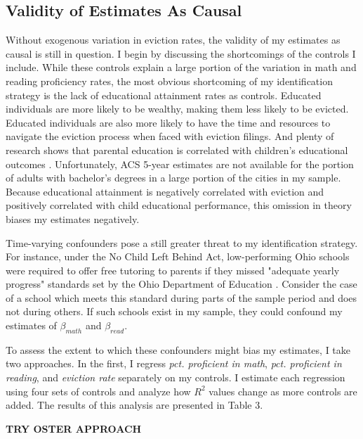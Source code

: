 \documentclass[12pt]{article}
\begin{document}
\subsection{Validity of Estimates As Causal}
Without exogenous variation in eviction rates, the validity of my estimates as causal is still in question. I begin by discussing the shortcomings of the controls I include. While these controls explain a large portion of the variation in math and reading proficiency rates, the most obvious shortcoming of my identification strategy is the lack of educational attainment rates as controls. Educated individuals are more likely to be wealthy, making them less likely to be evicted. Educated individuals are also more likely to have the time and resources to navigate the eviction process when faced with eviction filings. And plenty of research shows that parental education is correlated with children's educational outcomes \citep{havemen}. Unfortunately, ACS 5-year estimates are not available for the portion of adults with bachelor's degrees in a large portion of the cities in my sample. Because educational attainment is negatively correlated with eviction and positively correlated with child educational performance, this omission in theory biases my estimates negatively. 


Time-varying confounders pose a still greater threat to my identification strategy. For instance, under the No Child Left Behind Act, low-performing Ohio schools were required to offer free tutoring to parents if they missed "adequate yearly progress" standards set by the Ohio Department of Education \citep{klein_no_2015}. Consider the case of a school which meets this standard during parts of the sample period and does not during others. If such schools exist in my sample, they could confound my estimates of $\beta_{math}$ and $\beta_{read}$.


To assess the extent to which these confounders might bias my estimates, I take two approaches. In the first, I regress \emph{pct. proficient in math}, \emph{pct. proficient in reading}, and \emph{eviction rate} separately on my controls. I estimate each regression using four sets of controls and analyze how $R^2$ values change as more controls are added. The results of this analysis are presented in Table 3.

\textbf{TRY OSTER APPROACH}
\end{document}
